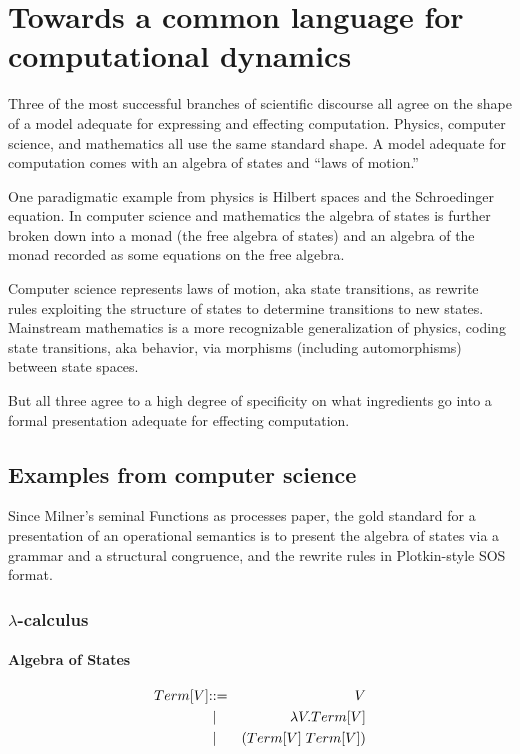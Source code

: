 \section{Towards a common language for computational dynamics}
Three of the most successful branches of scientific discourse all agree on the shape of a model adequate for expressing and effecting computation. Physics, computer science, and mathematics all use the same standard shape. A model adequate for computation comes with an algebra of states and “laws of motion.”

One paradigmatic example from physics is Hilbert spaces and the Schroedinger equation. In computer science and mathematics the algebra of states is further broken down into a monad (the free algebra of states) and an algebra of the monad recorded as some equations on the free algebra.

Computer science represents laws of motion, aka state transitions, as rewrite rules exploiting the structure of states to determine transitions to new states. Mainstream mathematics is a more recognizable generalization of physics, coding state transitions, aka behavior, via morphisms (including automorphisms) between state spaces.

But all three agree to a high degree of specificity on what ingredients go into a formal presentation adequate for effecting computation.

\subsection{Examples from computer science}
Since Milner's seminal Functions as processes paper, the gold standard for a presentation of an operational semantics is to present the algebra of states via a grammar and a structural congruence, and the rewrite rules in Plotkin-style SOS format.

\subsubsection{$\lambda$-calculus}

\paragraph{Algebra of States}
\begin{eqnarray*}
  Term[V] & \mathbin{\mathbf{::=}} & V \\
  & \;\mathbin{\mathbf\mid}\; & \lambda V.Term[V] \\
  & \;\mathbin{\mathbf\mid}\; & \mathsf{(} Term[V] \; Term[V] \mathsf{)}
\end{eqnarray*}

